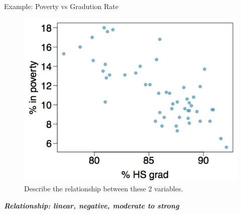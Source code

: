 \documentclass[
  ignorenonframetext,
]{beamer}
\begin{document}
\begin{frame}{Example: Poverty vs Gradution Rate}
\label{example-poverty-vs-gradution-rate}
\begin{figure}[H]

{\centering \includegraphics{class31_files/mediabag/poverty-vs-grad-rate.png}

}

\caption{Describe the relationship between these 2 variables.}

\end{figure}%

\pause

\textbf{\emph{Relationship: linear, negative, moderate to strong}}
\end{frame}
\end{document}
